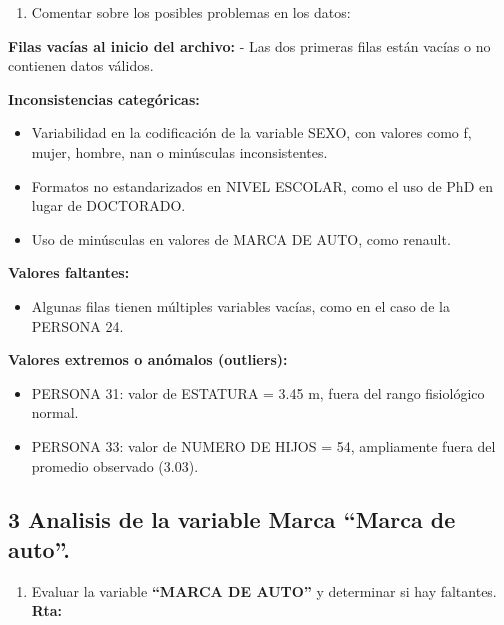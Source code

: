\documentclass[
]{article}
\providecommand{\tightlist}{%
  \setlength{\itemsep}{0pt}\setlength{\parskip}{0pt}}
\begin{document}
\begin{enumerate}
\def\labelenumi{\alph{enumi}.}
\setcounter{enumi}{5}
\tightlist
\item
  Comentar sobre los posibles problemas en los datos:
\end{enumerate}

\textbf{Filas vacías al inicio del archivo:} - Las dos primeras filas
están vacías o no contienen datos válidos.

\textbf{Inconsistencias categóricas:}

\begin{itemize}
\tightlist
\item
  Variabilidad en la codificación de la variable SEXO, con valores como
  f, mujer, hombre, nan o minúsculas inconsistentes.
\item
  Formatos no estandarizados en NIVEL ESCOLAR, como el uso de PhD en
  lugar de DOCTORADO.
\item
  Uso de minúsculas en valores de MARCA DE AUTO, como renault.
\end{itemize}

\textbf{Valores faltantes:}

\begin{itemize}
\tightlist
\item
  Algunas filas tienen múltiples variables vacías, como en el caso de la
  PERSONA 24.
\end{itemize}

\textbf{Valores extremos o anómalos (outliers):}

\begin{itemize}
\tightlist
\item
  PERSONA 31: valor de ESTATURA = 3.45 m, fuera del rango fisiológico
  normal.
\item
  PERSONA 33: valor de NUMERO DE HIJOS = 54, ampliamente fuera del
  promedio observado (3.03).
\end{itemize}

\newpage

\subsection{3 Analisis de la variable Marca ``Marca de
auto''.}\label{analisis-de-la-variable-marca-marca-de-auto.}

\begin{enumerate}
\def\labelenumi{\alph{enumi}.}
\tightlist
\item
  Evaluar la variable \textbf{``MARCA DE AUTO''} y determinar si hay
  faltantes. \textbf{Rta:}
\end{enumerate}
\end{document}
